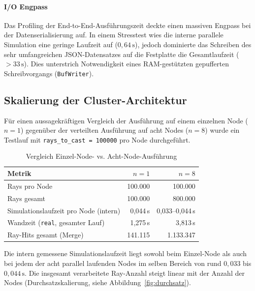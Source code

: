 \paragraph{I/O Engpass}
Das Profiling der End-to-End-Ausführungszeit deckte einen massiven Engpass bei der Datenserialisierung auf.
In einem Stresstest wies die interne parallele Simulation eine geringe Laufzeit auf ($0{,}64\,\text{s}$),
jedoch dominierte das Schreiben des sehr umfangreichen JSON-Datensatzes auf die Festplatte die Gesamtlaufzeit ($>33\,\text{s}$).
Dies unterstrich Notwendigkeit eines RAM-gestützten gepufferten Schreibvorgangs (\texttt{BufWriter}).

\subsection{Skalierung der Cluster-Architektur}
\label{subsec:cluster_eval}

Für einen aussagekräftigen Vergleich der Ausführung auf einem einzelnen Node ($n=1$) gegenüber der verteilten Ausführung auf acht Nodes ($n=8$) wurde ein Testlauf mit \texttt{rays\_to\_cast = 100000} pro Node durchgeführt.

\begin{table}[htbp]
 \centering
 \caption{Vergleich Einzel-Node- vs. Acht-Node-Ausführung}
 \label{tab:finaler-testlauf}
 \begin{tabular}{lrr}
 \toprule
 Metrik & $n=1$ & $n=8$ \\
 \midrule
 Rays pro Node & 100.000 & 100.000 \\
 Rays gesamt & 100.000 & 800.000 \\
 Simulationslaufzeit pro Node (intern) & 0{,}044\,s & 0{,}033--0{,}044\,s \\
 Wandzeit (\texttt{real}, gesamter Lauf) & 1{,}275\,s & 3{,}813\,s \\
 Ray-Hits gesamt (Merge) & 141.115 & 1.133.347 \\
 \bottomrule
 \end{tabular}
\end{table}

Die intern gemessene Simulationslaufzeit liegt sowohl beim Einzel-Node als auch bei jedem der acht parallel laufenden Nodes im selben Bereich von rund $0{,}033$ bis $0{,}044\,\text{s}$. Die insgesamt verarbeitete Ray-Anzahl steigt linear mit der Anzahl der Nodes (Durchsatzskalierung, siehe Abbildung~\ref{fig:durchsatz}).


